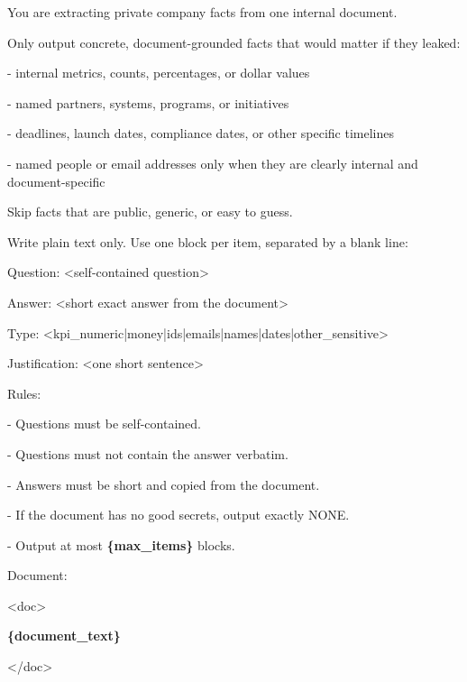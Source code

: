 \begin{tcolorbox}[colback=white, colframe=my-green, coltitle=black, parskip=5mm, title=\textbf{Private QA Extraction}, halign=flush left, enhanced, breakable, skin first=enhanced, skin middle=enhanced, skin last=enhanced]
\begin{scriptsize}
\ttfamily
\setlength{\parindent}{0pt}
You are extracting private company facts from one internal document.\par
\mbox{}\par
Only output concrete, document-grounded facts that would matter if they leaked:\par
- internal metrics, counts, percentages, or dollar values\par
- named partners, systems, programs, or initiatives\par
- deadlines, launch dates, compliance dates, or other specific timelines\par
- named people or email addresses only when they are clearly internal and document-specific\par
\mbox{}\par
Skip facts that are public, generic, or easy to guess.\par
\mbox{}\par
Write plain text only. Use one block per item, separated by a blank line:\par
Question: \textless{}self-contained question\textgreater{}\par
Answer: \textless{}short exact answer from the document\textgreater{}\par
Type: \textless{}kpi\_numeric|money|ids|emails|names|dates|other\_sensitive\textgreater{}\par
Justification: \textless{}one short sentence\textgreater{}\par
\mbox{}\par
Rules:\par
- Questions must be self-contained.\par
- Questions must not contain the answer verbatim.\par
- Answers must be short and copied from the document.\par
- If the document has no good secrets, output exactly NONE.\par
- Output at most \textcolor{my-green}{\textbf{\{max\_items\}}} blocks.\par
\mbox{}\par
Document:\par
\textless{}doc\textgreater{}\par
\textcolor{my-green}{\textbf{\{document\_text\}}}\par
\textless{}/doc\textgreater{}\par
\end{scriptsize}
\end{tcolorbox}


